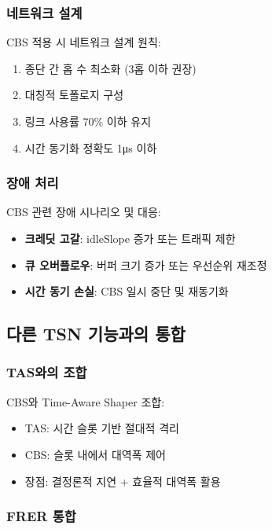 \documentclass[twocolumn,10pt]{article}
\begin{document}
\subsubsection{네트워크 설계}

CBS 적용 시 네트워크 설계 원칙:

\begin{enumerate}
    \item 종단 간 홉 수 최소화 (3홉 이하 권장)
    \item 대칭적 토폴로지 구성
    \item 링크 사용률 70\% 이하 유지
    \item 시간 동기화 정확도 1μs 이하
\end{enumerate}

\subsubsection{장애 처리}

CBS 관련 장애 시나리오 및 대응:

\begin{itemize}
    \item \textbf{크레딧 고갈}: idleSlope 증가 또는 트래픽 제한
    \item \textbf{큐 오버플로우}: 버퍼 크기 증가 또는 우선순위 재조정
    \item \textbf{시간 동기 손실}: CBS 일시 중단 및 재동기화
\end{itemize}

\subsection{다른 TSN 기능과의 통합}

\subsubsection{TAS와의 조합}

CBS와 Time-Aware Shaper 조합:

\begin{itemize}
    \item TAS: 시간 슬롯 기반 절대적 격리
    \item CBS: 슬롯 내에서 대역폭 제어
    \item 장점: 결정론적 지연 + 효율적 대역폭 활용
\end{itemize}

\subsubsection{FRER 통합}
\end{document}
